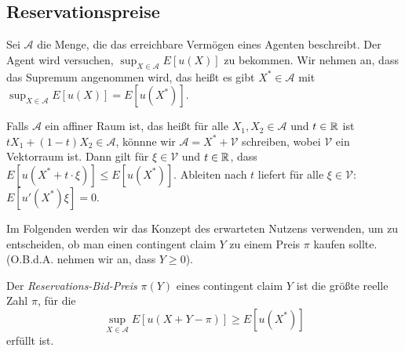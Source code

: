 \documentclass[a4paper,twoside,DIV15,BCOR12mm]{scrbook}
\newcommand{\cA}{\mathcal A}
\newcommand{\cV}{\mathcal V}
\begin{document}
\subsection{Reservationspreise}

Sei $\cA$ die Menge, die das erreichbare Vermögen eines Agenten beschreibt. Der Agent wird versuchen, $\sup_{X\in\cA}E[u(X)]$ zu bekommen. Wir nehmen an, dass das Supremum angenommen wird, das heißt es gibt $X^*\in\cA$ mit $\sup_{X\in\cA}E[u(X)] = E[u(X^*)]$.

Falls $\cA$ ein affiner Raum ist, das heißt für alle $X_1,X_2\in \cA$ und $t\in\mathbb{R}$ ist $tX_1 + (1-t)X_2 \in \cA$, könnne wir $\cA = X^* + \cV$ schreiben, wobei $\cV$ ein Vektorraum ist. Dann gilt für $\xi\in\cV$ und $t\in \mathbb{R}$, dass $E[u(X^* + t\cdot\xi)] \le E[u(X^*)]$. Ableiten nach $t$ liefert für alle $\xi\in\cV$: $E[u'(X^*)\xi]=0$.

Im Folgenden werden wir das Konzept des erwarteten Nutzens verwenden, um zu entscheiden, ob man einen contingent claim $Y$ zu einem Preis $\pi$ kaufen sollte. (O.B.d.A. nehmen wir an, dass $Y\ge 0$).

\begin{definition}
Der \emph{Reservations-Bid-Preis} $\pi(Y)$ eines contingent claim $Y$ ist die größte reelle Zahl $\pi$, für die \[\sup_{X\in\cA} E[u(X+Y-\pi)] \ge E[u(X^*)]\] erfüllt ist.
\end{definition}
\end{document}
